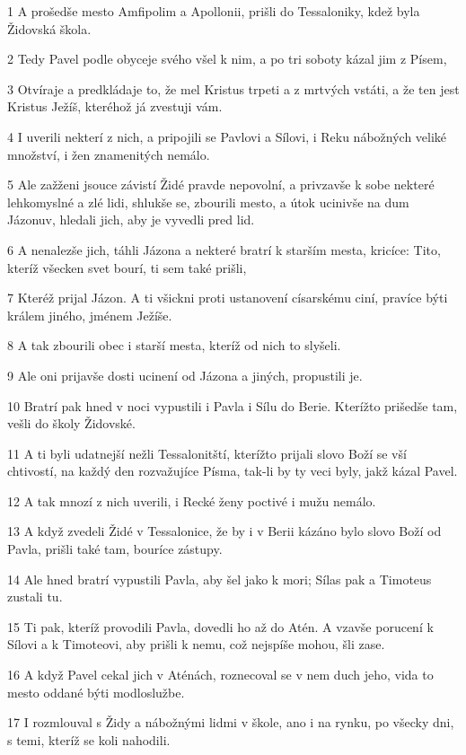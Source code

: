 \par 1 A prošedše mesto Amfipolim a Apollonii, prišli do Tessaloniky, kdež byla Židovská škola.
\par 2 Tedy Pavel podle obyceje svého všel k nim, a po tri soboty kázal jim z Písem,
\par 3 Otvíraje a predkládaje to, že mel Kristus trpeti a z mrtvých vstáti, a že ten jest Kristus Ježíš, kteréhož já zvestuji vám.
\par 4 I uverili nekterí z nich, a pripojili se Pavlovi a Sílovi, i Reku nábožných veliké množství, i žen znamenitých nemálo.
\par 5 Ale zažženi jsouce závistí Židé pravde nepovolní, a privzavše k sobe nekteré lehkomyslné a zlé lidi, shlukše se, zbourili mesto, a útok ucinivše na dum Jázonuv, hledali jich, aby je vyvedli pred lid.
\par 6 A nenalezše jich, táhli Jázona a nekteré bratrí k starším mesta, kricíce: Tito, kteríž všecken svet bourí, ti sem také prišli,
\par 7 Kteréž prijal Jázon. A ti všickni proti ustanovení císarskému ciní, pravíce býti králem jiného, jménem Ježíše.
\par 8 A tak zbourili obec i starší mesta, kteríž od nich to slyšeli.
\par 9 Ale oni prijavše dosti ucinení od Jázona a jiných, propustili je.
\par 10 Bratrí pak hned v noci vypustili i Pavla i Sílu do Berie. Kterížto prišedše tam, vešli do školy Židovské.
\par 11 A ti byli udatnejší nežli Tessalonitští, kterížto prijali slovo Boží se vší chtivostí, na každý den rozvažujíce Písma, tak-li by ty veci byly, jakž kázal Pavel.
\par 12 A tak mnozí z nich uverili, i Recké ženy poctivé i mužu nemálo.
\par 13 A když zvedeli Židé v Tessalonice, že by i v Berii kázáno bylo slovo Boží od Pavla, prišli také tam, bouríce zástupy.
\par 14 Ale hned bratrí vypustili Pavla, aby šel jako k mori; Sílas pak a Timoteus zustali tu.
\par 15 Ti pak, kteríž provodili Pavla, dovedli ho až do Atén. A vzavše porucení k Sílovi a k Timoteovi, aby prišli k nemu, což nejspíše mohou, šli zase.
\par 16 A když Pavel cekal jich v Aténách, roznecoval se v nem duch jeho, vida to mesto oddané býti modloslužbe.
\par 17 I rozmlouval s Židy a nábožnými lidmi v škole, ano i na rynku, po všecky dni, s temi, kteríž se koli nahodili.
